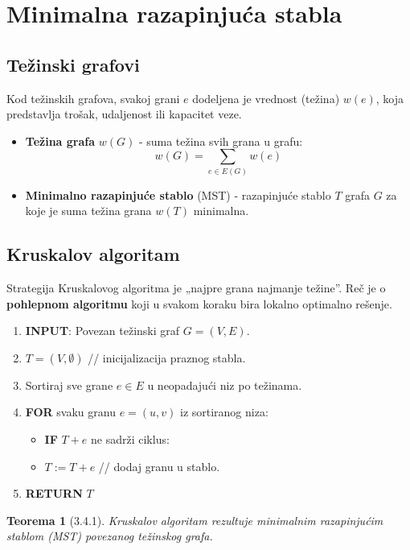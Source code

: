\documentclass[a4paper,12pt,twoside]{report}
\newtheorem{theorem}{Teorema}[section]
\numberwithin{algorithm}{section}
\begin{document}
\section{Minimalna razapinjuća stabla}

\subsection{Težinski grafovi}
Kod težinskih grafova, svakoj grani $e$ dodeljena je vrednost (težina) $w(e)$, koja predstavlja trošak, udaljenost ili kapacitet veze.

\begin{itemize}
    \item \textbf{Težina grafa} $w(G)$ - suma težina svih grana u grafu:
    $$w(G) = \sum_{e \in E(G)} w(e)$$
    \item \textbf{Minimalno razapinjuće stablo} (MST) - razapinjuće stablo $T$ grafa $G$ za koje je suma težina grana $w(T)$ minimalna.
\end{itemize}

\subsection{Kruskalov algoritam}
Strategija Kruskalovog algoritma je „najpre grana najmanje težine”. Reč je o \textbf{pohlepnom algoritmu} koji u svakom koraku bira lokalno optimalno rešenje.
\newpage
\begin{algorithm}[ht]
    \caption{Kruskalov algoritam}
    \begin{enumerate}
        \item \textbf{INPUT}: Povezan težinski graf $G = (V, E)$.
        \item $T = (V, \emptyset)$ // inicijalizacija praznog stabla.
        \item Sortiraj sve grane $e \in E$ u neopadajući niz po težinama.
        \item \textbf{FOR} svaku granu $e = (u, v)$ iz sortiranog niza:
        \begin{itemize}
            \item \textbf{IF} $T + e$ ne sadrži ciklus:
            \item $T := T + e$ // dodaj granu u stablo.
        \end{itemize}
        \item \textbf{RETURN} $T$
    \end{enumerate}
\end{algorithm}

\begin{theorem}[3.4.1]
    Kruskalov algoritam rezultuje minimalnim razapinjućim stablom (MST) povezanog težinskog grafa.
\end{theorem}
\end{document}
